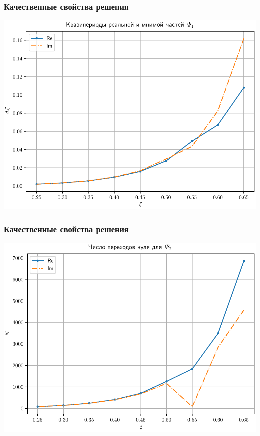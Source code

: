 \documentclass[utf8,9pt,mathserif,usepdftitle=false]{beamer}
\begin{document}
\begin{frame}
	\frametitle{Качественные свойства решения}%
	\includegraphics[width=\linewidth]{ri-widths-ru}
\end{frame}

\begin{frame}
	\frametitle{Качественные свойства решения}%
	\includegraphics[width=\linewidth]{psi2-trans-ru}
\end{frame}
\end{document}
